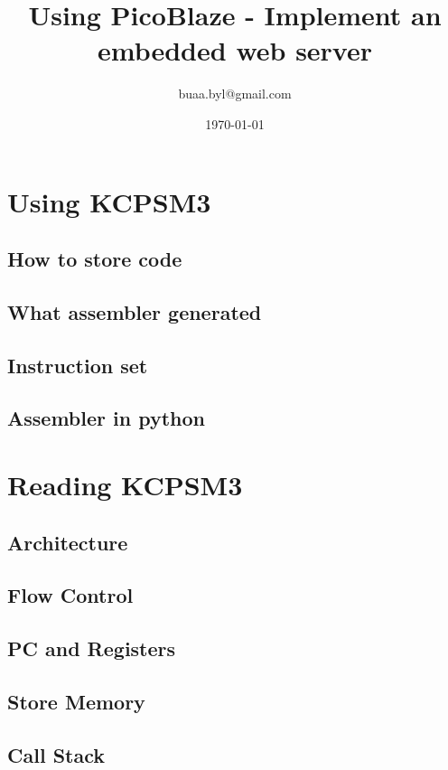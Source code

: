 \documentclass[a4paper]{book}
\begin{document}
 \begin{CJK*}{UTF8}{song} \large

\title{Using PicoBlaze - Implement an embedded web server}
\author{buaa.byl@gmail.com}
\date{\today}
\maketitle
\tableofcontents



\part{Using KCPSM3}
\chapter{How to store code}
\chapter{What assembler generated}
\chapter{Instruction set}
\chapter{Assembler in python}

\part{Reading KCPSM3}
\chapter{Architecture}


\chapter{Flow Control}
\chapter{PC and Registers}
\chapter{Store Memory}
\chapter{Call Stack}

\end{CJK*}
\end{document}
